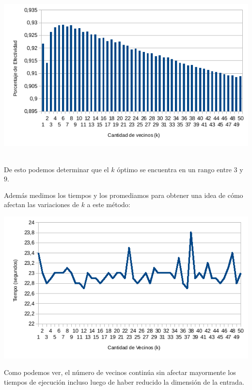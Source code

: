 \begin{center}
\includegraphics[scale=0.6]{nuevosResultados/testeokparapcaconalfa=13.png}\\
\end{center}
\\
De esto podemos determinar que el $k$ óptimo se encuentra en un rango entre $3$ y $9$.

Además medimos los tiempos y los promediamos para obtener una idea de cómo afectan las variaciones de $k$ a este método:
\begin{center}
\includegraphics[scale=0.6]{nuevosResultados/pca/k/temp.png}\\
\end{center}

Como podemos ver, el número de vecinos continúa sin afectar mayormente los tiempos de ejecución incluso luego de haber reducido la dimensión de la entrada.

